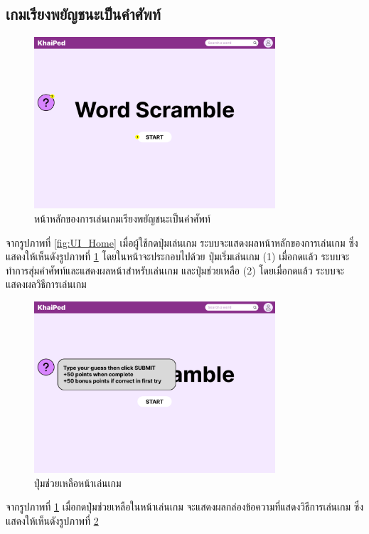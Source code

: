 \documentclass[12pt,oneside,openright,a4paper]{cpe-thai-project}
\begin{document}
\subsection{เกมเรียงพยัญชนะเป็นคำศัพท์}
\begin{figure}[!h]\centering
	\includegraphics[width=0.8\textwidth, keepaspectratio=true]{image/chap3/ui/game/Word Scramble.png}
	\caption{หน้าหลักของการเล่นเกมเรียงพยัญชนะเป็นคำศัพท์}\label{fig:UI_Game}
\end{figure}
\hspace{1cm}
จากรูปภาพที่ \ref{fig:UI_Home} เมื่อผู้ใช้กดปุ่มเล่นเกม ระบบจะแสดงผลหน้าหลักของการเล่นเกม ซึ่งแสดงให้เห็นดังรูปภาพที่ \ref{fig:UI_Game} โดยในหน้าจะประกอบไปด้วย
ปุ่มเริ่มเล่นเกม (1) เมื่อกดแล้ว ระบบจะทำการสุ่มคำศัพท์และแสดงผลหน้าสำหรับเล่นเกม และปุ่มช่วยเหลือ (2) โดยเมื่อกดแล้ว ระบบจะแสดงผลวิธีการเล่นเกม

\begin{figure}[!h]\centering
	\includegraphics[width=0.8\textwidth, keepaspectratio=true]{image/chap3/ui/game/Word Scramble - Help.png}
	\caption{ปุ่มช่วยเหลือหน้าเล่นเกม}\label{fig:UI_GameHelp}
\end{figure}
\hspace{1cm}
จากรูปภาพที่ \ref{fig:UI_Game} เมื่อกดปุ่มช่วยเหลือในหน้าเล่นเกม จะแสดงผลกล่องข้อความที่แสดงวิธีการเล่นเกม ซึ่งแสดงให้เห็นดังรูปภาพที่ \ref{fig:UI_GameHelp}
\end{document}
